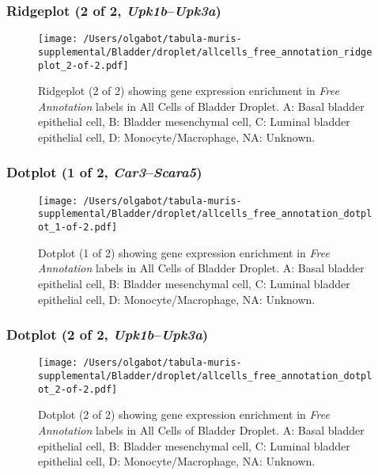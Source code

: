\clearpage

\subsubsection{Ridgeplot (2 of 2, \emph{Upk1b}--\emph{Upk3a})}
\begin{figure}[h]
\centering
\texttt{[image: /Users/olgabot/tabula-muris-supplemental/Bladder/droplet/allcells\_free\_annotation\_ridgeplot\_2-of-2.pdf]}

\caption{ Ridgeplot (2 of 2)  showing gene expression enrichment in \emph{Free Annotation} labels in All Cells of Bladder Droplet. A: Basal bladder epithelial cell, B: Bladder mesenchymal cell, C: Luminal bladder epithelial cell, D: Monocyte/Macrophage, NA: Unknown.}
\end{figure}


\clearpage

\subsubsection{Dotplot (1 of 2, \emph{Car3}--\emph{Scara5})}
\begin{figure}[h]
\centering
\texttt{[image: /Users/olgabot/tabula-muris-supplemental/Bladder/droplet/allcells\_free\_annotation\_dotplot\_1-of-2.pdf]}

\caption{ Dotplot (1 of 2)  showing gene expression enrichment in \emph{Free Annotation} labels in All Cells of Bladder Droplet. A: Basal bladder epithelial cell, B: Bladder mesenchymal cell, C: Luminal bladder epithelial cell, D: Monocyte/Macrophage, NA: Unknown.}
\end{figure}


\clearpage

\subsubsection{Dotplot (2 of 2, \emph{Upk1b}--\emph{Upk3a})}
\begin{figure}[h]
\centering
\texttt{[image: /Users/olgabot/tabula-muris-supplemental/Bladder/droplet/allcells\_free\_annotation\_dotplot\_2-of-2.pdf]}

\caption{ Dotplot (2 of 2)  showing gene expression enrichment in \emph{Free Annotation} labels in All Cells of Bladder Droplet. A: Basal bladder epithelial cell, B: Bladder mesenchymal cell, C: Luminal bladder epithelial cell, D: Monocyte/Macrophage, NA: Unknown.}
\end{figure}



